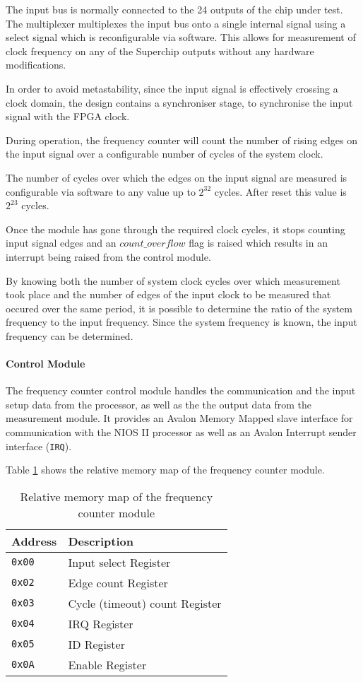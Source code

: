 The input bus is normally connected to the 24 outputs of the chip under test. The
multiplexer multiplexes the input bus onto a single internal signal using a select signal
which is reconfigurable via software. This allows for measurement of clock frequency
on any of the Superchip outputs without any hardware modifications.

In order to avoid metastability, since the input signal is effectively crossing a
clock domain, the design contains a synchroniser stage, to synchronise the input signal
with the FPGA clock.

During operation, the frequency counter will count the number of rising edges on the
input signal over a configurable number of cycles of the system clock.

The number of cycles over which
the edges on the input signal are measured is configurable via software to any value up
to $2^{32}$ cycles. After reset this value is $2^{23}$ cycles.

Once the module has gone through the required clock cycles, it stops counting input signal
edges and an $count\_overflow$ flag is raised which results in an interrupt being raised
from the control module.

By knowing both the number of system clock cycles over which measurement took place
and the number of edges of the input clock to be measured that occured over the same
period, it is possible to determine the ratio of the system frequency to the input
frequency. Since the system frequency is known, the input frequency can be determined.


\paragraph{Control Module}
The frequency counter control module handles the communication and the input setup
data from the processor, as well as the the output data from the measurement module.
It provides an Avalon Memory Mapped slave interface for communication with the
NIOS II processor as well as an Avalon Interrupt sender interface (\texttt{IRQ}).

Table \ref{table:fcounter_memorymap} shows the relative memory map of the frequency
counter module.


\begin{table}[h!]
\centering
\begin{tabular}{ | l | l | }
 \hline
   Address       & Description \\
 \hline
   \texttt{0x00} & Input select Register \\
 \hline
   \texttt{0x02} & Edge count Register \\
 \hline
   \texttt{0x03} & Cycle (timeout) count Register \\
 \hline
   \texttt{0x04} & IRQ Register \\
 \hline
   \texttt{0x05} & ID Register \\
 \hline
   \texttt{0x0A} & Enable Register \\
 \hline
\end{tabular}
\caption{Relative memory map of the frequency counter module}
\label{table:fcounter_memorymap}
\end{table}



